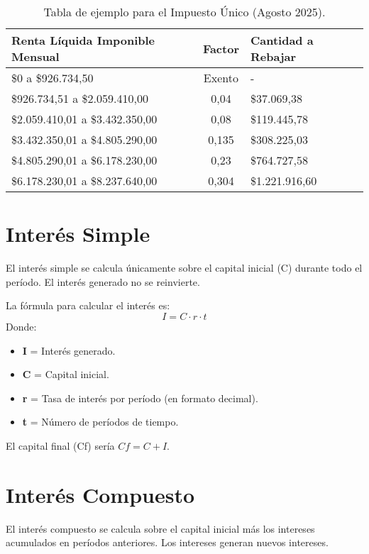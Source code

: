 \documentclass[11pt]{article}
\begin{document}
\begin{table}[h!]
\centering
\renewcommand{\arraystretch}{1.2}
\begin{tabular}{|>{\centering\arraybackslash}p{4.5cm}|c|>{\centering\arraybackslash}p{3cm}|}
    \hline
    \textbf{Renta Líquida Imponible Mensual} & \textbf{Factor} & \textbf{Cantidad a Rebajar} \\
    \hline
    \$0 a \$926.734,50 & Exento & - \\
    \hline
    \$926.734,51 a \$2.059.410,00 & 0,04 & \$37.069,38 \\
    \hline
    \$2.059.410,01 a \$3.432.350,00 & 0,08 & \$119.445,78 \\
    \hline
    \$3.432.350,01 a \$4.805.290,00 & 0,135 & \$308.225,03 \\
    \hline
    \$4.805.290,01 a \$6.178.230,00 & 0,23 & \$764.727,58 \\
    \hline
    \$6.178.230,01 a \$8.237.640,00 & 0,304 & \$1.221.916,60 \\
    \hline
\end{tabular}
\caption{Tabla de ejemplo para el Impuesto Único (Agosto 2025).}
\end{table}

\section{Interés Simple}
El interés simple se calcula únicamente sobre el capital inicial (C) durante todo el período. El interés generado no se reinvierte.

La fórmula para calcular el interés es:
\begin{equation*}
I = C \cdot r \cdot t
\end{equation*}
Donde:
\begin{itemize}
    \item \textbf{I} = Interés generado.
    \item \textbf{C} = Capital inicial.
    \item \textbf{r} = Tasa de interés por período (en formato decimal).
    \item \textbf{t} = Número de períodos de tiempo.
\end{itemize}
El capital final (Cf) sería $Cf = C + I$.

\section{Interés Compuesto}
El interés compuesto se calcula sobre el capital inicial más los intereses acumulados en períodos anteriores. Los intereses generan nuevos intereses.
\end{document}
